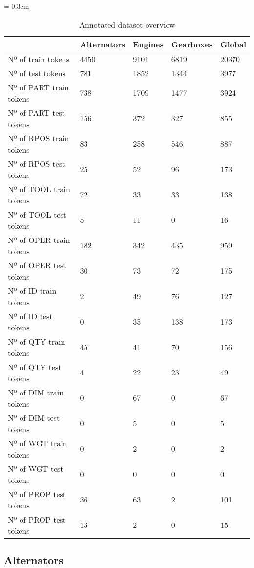 \begin{table}[t]
	\caption{Annotated dataset overview}
	\tabulinesep = 0.3em
	\setlength{\tabcolsep}{0.2em}
	\centering
	\begin{tabu} { X[3.0,l,m] X[1.3,r,m] X[r,m] X[1.2,r,m] X[r,m] }
		\rowfont{\bfseries\itshape} & Alternators & Engines & Gearboxes & Global \\
		\hline
		Nº of train tokens & 4450 & 9101 & 6819 & 20370 \\
		Nº of test tokens & 781 & 1852 & 1344 & 3977 \\
		Nº of PART train tokens & 738 & 1709 & 1477 & 3924 \\
		Nº of PART test tokens & 156 & 372 & 327 & 855 \\
		Nº of RPOS train tokens & 83 & 258 & 546 & 887 \\
		Nº of RPOS test tokens & 25 & 52 & 96 & 173 \\
		Nº of TOOL train tokens & 72 & 33 & 33 & 138 \\
		Nº of TOOL test tokens & 5 & 11 & 0 & 16 \\
		Nº of OPER train tokens & 182 & 342 & 435 & 959 \\
		Nº of OPER test tokens & 30 & 73 & 72 & 175 \\
		Nº of ID train tokens & 2 & 49 & 76 & 127 \\
		Nº of ID test tokens & 0 & 35 & 138 & 173 \\
		Nº of QTY train tokens & 45 & 41 & 70 & 156 \\
		Nº of QTY test tokens & 4 & 22 & 23 & 49 \\
		Nº of DIM train tokens & 0 & 67 & 0 & 67 \\
		Nº of DIM test tokens & 0 & 5 & 0 & 5 \\
		Nº of WGT train tokens & 0 & 2 & 0 & 2 \\
		Nº of WGT test tokens & 0 & 0 & 0 & 0 \\
		Nº of PROP test tokens & 36 & 63 & 2 & 101 \\
		Nº of PROP test tokens & 13 & 2 & 0 & 15 \\
	\end{tabu}
	\label{tab:dataset-sources_annotated-dataset-overview}
\end{table}



\subsection{Alternators}

